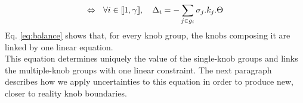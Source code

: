 \begin{equation}
\centering
\label{eq:balance}
\Leftrightarrow\ \ \forall i \in \llbracket 1,\gamma \rrbracket,\ \ \ \Delta_{i}=-\sum\limits_{j\in g_{i}}\sigma_{j}.k_{j}.\Theta
\end{equation}
Eq. \ref{eq:balance} shows that, for every knob group, the knobs composing it are linked by one linear equation.\\
This equation determines uniquely the value of the single-knob groups and links the multiple-knob groups with one linear constraint. The next paragraph describes how we apply uncertainties to this equation in order to produce new, closer to reality knob boundaries.\\

